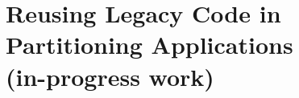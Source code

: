 \declarecommand{\sysname}{\civet{}}

\chapter{Reusing Legacy Code in Partitioning \java{} Applications\\ (in-progress work)}
\label{chap:civet}







%

